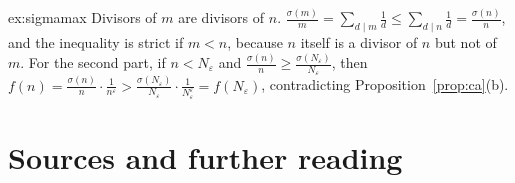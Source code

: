 \begin{solution}{ex:sigmamax}
\idea Divisors of $m$ are divisors of $n$.
\writeup $\frac{\sigma(m)}m=\sum_{d\mid m}\frac1d\le\sum_{d\mid n}\frac1d=\frac{\sigma(n)}n$, and the inequality is strict if $m<n$, because $n$ itself is a divisor of $n$ but not of $m$. For
the second part, if $n<N_\varepsilon$ and $\frac{\sigma(n)}n\ge\frac{\sigma(N_\varepsilon)}{N_\varepsilon}$, then $f(n)=\frac{\sigma(n)}n\cdot\frac1{n^\varepsilon}>\frac{\sigma(N_\varepsilon)}{N_\varepsilon}\cdot\frac1{N_\varepsilon^\varepsilon}=f(N_\varepsilon)$,
contradicting Proposition~\ref{prop:ca}(b).
\end{solution}

\section*{Sources and further reading}

